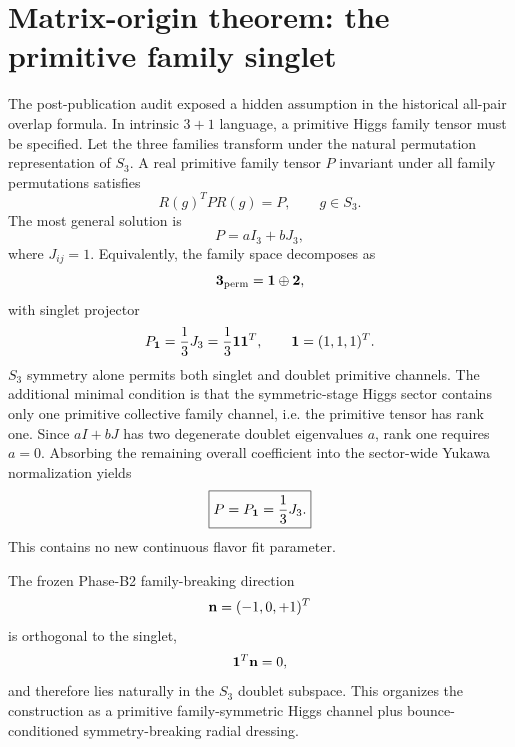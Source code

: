 \documentclass[11pt]{article}
\begin{document}
\section{Matrix-origin theorem: the primitive family singlet}
The post-publication audit exposed a hidden assumption in the historical all-pair overlap formula. In intrinsic $3+1$ language, a primitive Higgs family tensor must be specified. Let the three families transform under the natural permutation representation of $S_3$. A real primitive family tensor $P$ invariant under all family permutations satisfies
\begin{equation}
R(g)^T P R(g)=P,
\qquad g\in S_3.
\end{equation}
The most general solution is
\begin{equation}
P=aI_3+bJ_3,
\end{equation}
where $J_{ij}=1$. Equivalently, the family space decomposes as
\begin{equation}
{\bf3}_{\rm perm}={\bf1}\oplus{\bf2},
\end{equation}
with singlet projector
\begin{equation}
P_{\bf1}=\frac13J_3=\frac13{\bf1}{\bf1}^T,
\qquad {\bf1}=(1,1,1)^T.
\end{equation}
$S_3$ symmetry alone permits both singlet and doublet primitive channels. The additional minimal condition is that the symmetric-stage Higgs sector contains only one primitive collective family channel, i.e. the primitive tensor has rank one. Since $aI+bJ$ has two degenerate doublet eigenvalues $a$, rank one requires $a=0$. Absorbing the remaining overall coefficient into the sector-wide Yukawa normalization yields
\begin{equation}
\boxed{P=P_{\bf1}=\frac13J_3.}
\end{equation}
This contains no new continuous flavor fit parameter.

The frozen Phase-B2 family-breaking direction
\begin{equation}
{\bf n}=(-1,0,+1)^T
\end{equation}
is orthogonal to the singlet,
\begin{equation}
{\bf1}^T{\bf n}=0,
\end{equation}
and therefore lies naturally in the $S_3$ doublet subspace. This organizes the construction as a primitive family-symmetric Higgs channel plus bounce-conditioned symmetry-breaking radial dressing.
\end{document}
